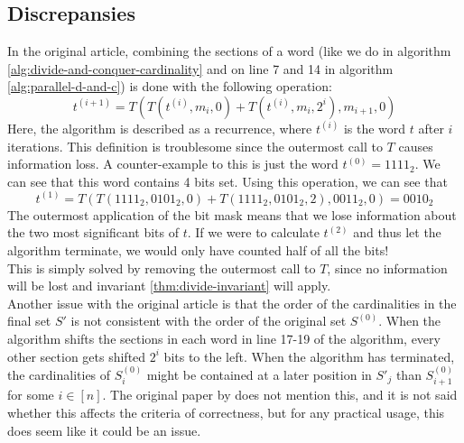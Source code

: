 \subsection{Discrepansies}
In the original article, combining the sections of a word (like we do in algorithm \ref{alg:divide-and-conquer-cardinality} and on line 7 and 14 in algorithm \ref{alg:parallel-d-and-c}) is done with the following operation:
$$t^{(i+1)}=T(T(t^{(i)}, m_i, 0) + T(t^{(i)}, m_i, 2^i), m_{i+1}, 0)$$
Here, the algorithm is described as a recurrence, where $t^{(i)}$ is the word $t$ after $i$ iterations. This definition is troublesome since the outermost call to $T$ causes information loss. A counter-example to this is just the word $t^{(0)} = 1111_2$. We can see that this word contains 4 bits set. Using this operation, we can see that 
$$t^{(1)}=T(T(1111_2, 0101_2, 0) + T(1111_2, 0101_2, 2), 0011_2, 0) = 0010_2$$
The outermost application of the bit mask means that we lose information about the two most significant bits of $t$. If we were to calculate $t^{(2)}$ and thus let the algorithm terminate, we would only have counted half of all the bits!\\
This is simply solved by removing the outermost call to $T$, since no information will be lost and invariant \ref{thm:divide-invariant} will apply.\\
Another issue with the original article is that the order of the cardinalities in the final set $S'$ is not consistent with the order of the original set $S^{(0)}$.
When the algorithm shifts the sections in each word in line 17-19 of the algorithm, every other section gets shifted $2^i$ bits to the left. 
When the algorithm has terminated, the cardinalities of $S^{(0)}_i$ might be contained at a later position in $S'_j$ than $S^{(0)}_{i+1}$ for some $i\in [n]$. The original paper by \citet{fast-similarity-search} does not mention this, and it is not said whether this affects the criteria of correctness, but for any practical usage, this does seem like it could be an issue. 

